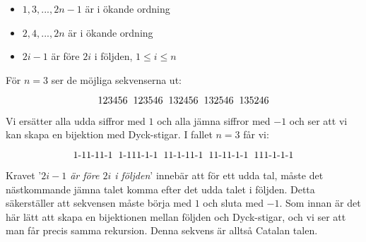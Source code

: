 \documentclass{tufte-handout}
\begin{document}
\begin{ans}
\begin{enumerate}
      \begin{itemize}
          \item $1,3,...,2n-1$ är i ökande ordning
          \item $2,4,...,2n$ är i ökande ordning
          \item $2i -1$ är före $2i$ i följden, $1 \leq i \leq n$
      \end{itemize}

      \noindent
      För $n = 3$ ser de möjliga sekvenserna ut:

      \begin{equation}
          123456 \hspace{2mm} 123546 \hspace{2mm} 132456 \hspace{2mm} 132546 \hspace{2mm} 135246 
      \end{equation}

      \noindent
      Vi ersätter alla udda siffror med $1$ och alla jämna siffror med $-1$ och ser att vi kan skapa en bijektion med Dyck-stigar. I fallet $n=3$ får vi:

      \begin{equation}
          \text{1-11-11-1} \hspace{2mm} \text{1-111-1-1} \hspace{2mm} \text{11-1-11-1} \hspace{2mm} \text{11-11-1-1} \hspace{2mm} \text{111-1-1-1} 
      \end{equation}

      \noindent
      Kravet '\textit{$2i-1$ är före $2i$ i följden}' innebär att för ett udda tal, måste det nästkommande jämna talet komma efter det udda talet i följden. Detta säkerställer att sekvensen måste börja med $1$ och sluta med $-1$. Som innan är det här lätt att skapa en bijektionen mellan följden och Dyck-stigar, och vi ser att man får precis samma rekursion. Denna sekvens är alltså Catalan talen.
  \end{enumerate}
\end{ans}
\end{document}
